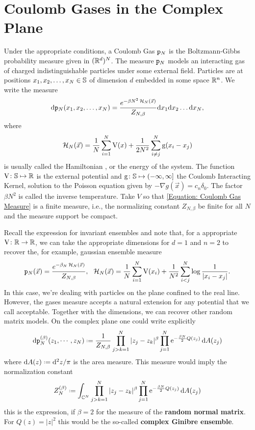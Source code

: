 \section{Coulomb Gases in the Complex Plane}

Under the appropriate conditions, a Coulomb Gas $\mathtt{p}_N$ is the Boltzmann-Gibbs probability measure given in $(\mathbb{R}^d)^N$. The measure $\mathtt{p}_N$ models an interacting gas of charged indistinguishable particles under some external field. Particles are at positions $x_1, x_2, \dots, x_N \in \mathbb{S}$ of dimension $d$ embedded in some space $\mathbb{R}^n$. We write the measure 
\begin{equation}
	\mathrm{d} \mathtt{p}_N(x_1, x_2, \dots, x_N) = \frac{e^{-\beta N^2 \operatorname{\mathcal{H}}_N(\vec{x})}}{Z_{N,\beta}} \mathrm{d} x_1  \mathrm{d} x_2  \dots  \mathrm{d} x_N,
	\label{Equation: Coulomb Gas Measure}
\end{equation}
where $$\operatorname{\mathcal{H}}_N(\vec{x}) = \frac{1}{N} \sum_{i = 1}^{N} \operatorname{V}(x) + \frac{1}{2N^2} \sum_{i \neq j}^{N} \operatorname{g}(x_i - x_j)$$ is usually called the Hamiltonian , or the energy of the system. The function $\operatorname{V} \colon \mathbb{S} \mapsto \mathbb{R}$ is the external potential and $\operatorname{g} \colon \mathbb{S} \mapsto (-\infty, \infty]$ the Coulomb Interacting Kernel, solution to the Poisson equation given by $- \nabla g(\vec{x}) = c_n\delta_0$. The factor $\beta N^2$ is called the inverse temperature. Take $V$ so that \eqref{Equation: Coulomb Gas Measure} is a finite measure, i.e., the normalizing constant $Z_{N, \beta}$ be finite for all $N$ and the measure support be compact.

Recall the expression for invariant ensembles and note that, for a appropriate $\operatorname{V} \colon \mathbb{R} \rightarrow \mathbb{R}$, we can take the appropriate dimensions for $d=1$ and $n = 2$ to recover the, for example, gaussian ensemble measure
\begin{equation}
	\mathtt{p}_N(\vec{x}) = \frac{e^{-\beta_N \operatorname{\mathcal{H}}_N(\vec{x})}}{Z_{N,\beta}}, \ \ \operatorname{\mathcal{H}}_N(\vec{x}) = \frac{1}{N} \sum_{i = 1}^{N} \operatorname{V}(x_i) + \frac{1}{N^2} \sum_{i < j}^{N} \log{\frac{1}{|x_i - x_j|}}.
\end{equation}
In this case, we're dealing with particles on the plane confined to the real line. However, the gases measure accepts a natural extension for any potential that we call acceptable. Together with the dimensions, we can recover other random matrix models. On the complex plane one could write explicitly
\begin{equation}
	\dd \p_N^{(\beta)} (z_1, \cdots, z_N) \deff \frac{1}{Z_{N,\beta}} \prod_{j > k = 1}^{N} |z_j - z_k|^\beta \prod_{j=1}^{N} \ee^{- \frac{\beta N}{2} Q(z_j)} \dd A(z_j)
\end{equation}
where $\dd A(z) \deff \dd^2 z / \pi$ is the area measure. This measure would imply the normalization constant
\begin{equation}
	Z_N^{(\beta)} \deff \int_{\C^N} \prod_{j > k = 1}^{N} |z_j - z_k|^\beta \prod_{j=1}^{N} \ee^{- \frac{\beta N}{2} Q(z_j)} \dd A(z_j)
\end{equation}
this is the expression, if $\beta = 2$ for the measure of the \textbf{random normal matrix}. For $Q(z) = |z|^2$ this would be the so-called \textbf{complex Ginibre ensemble}.

